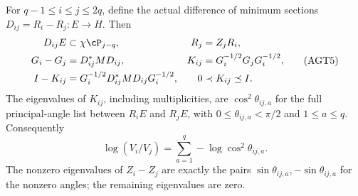 \begin{theorem}
For $q-1\le i\le j\le2q$, define the actual difference of
minimum sections $D_{ij}=R_i-R_j:E\to H$. Then
\[
 \begin{aligned}
 D_{ij}E&\subset\chi\cP_{j-q},& R_j&=Z_jR_i,\\
 G_i-G_j&=D_{ij}^*M D_{ij},&
 K_{ij}&=G_i^{-1/2}G_jG_i^{-1/2},\\
 I-K_{ij}&=G_i^{-1/2}D_{ij}^*M D_{ij}G_i^{-1/2},&
 0&\prec K_{ij}\preceq I.
 \end{aligned}
 \tag{AGT5}
\]
The eigenvalues of $K_{ij}$, including multiplicities, are
$\cos^2\theta_{ij,a}$ for the full principal-angle list between
$R_iE$ and $R_jE$, with $0\le\theta_{ij,a}<\pi/2$ and
$1\le a\le q$. Consequently
\[
 \log(V_i/V_j)=\sum_{a=1}^q-\log\cos^2\theta_{ij,a}.
 \tag{AGT6}
\]
The nonzero eigenvalues of $Z_i-Z_j$ are exactly the pairs
$\sin\theta_{ij,a},-\sin\theta_{ij,a}$ for the nonzero angles;
the remaining eigenvalues are zero.
\end{theorem}
